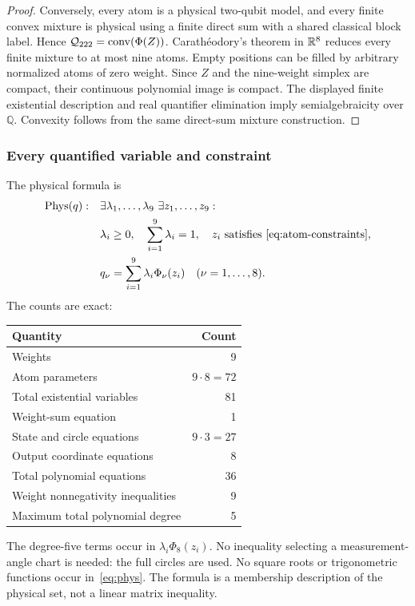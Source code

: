 \begin{proof}
Conversely, every atom is a physical two-qubit model, and every finite convex mixture is physical using a finite direct sum with a shared classical block label. Hence ${\mathcal Q_{222}}=\operatorname{conv}(\Phi(Z))$. Carath\'eodory's theorem in $\mathbb R^8$ reduces every finite mixture to at most nine atoms. Empty positions can be filled by arbitrary normalized atoms of zero weight. Since $Z$ and the nine-weight simplex are compact, their continuous polynomial image is compact. The displayed finite existential description and real quantifier elimination imply semialgebraicity over $\mathbb Q$. Convexity follows from the same direct-sum mixture construction.
\end{proof}

\subsubsection{Every quantified variable and constraint}
The physical formula is
\begin{equation}\label{eq:phys}
 \begin{aligned}
 \Phys(q):\quad&\exists\lambda_1,\ldots,\lambda_9\ 
                  \exists z_1,\ldots,z_9:\\
 &\lambda_i\ge0,\quad\sum_{i=1}^{9}\lambda_i=1,\quad
                  z_i\text{ satisfies~\eqref{eq:atom-constraints}},\\
 &q_\nu=\sum_{i=1}^{9}\lambda_i\Phi_\nu(z_i)
       \quad(\nu=1,\ldots,8).
 \end{aligned}
\end{equation}
The counts are exact:
\begin{center}
\begin{tabular}{lr}
\toprule
Quantity&Count\\\midrule
Weights&9\\
Atom parameters&$9\cdot8=72$\\
Total existential variables&81\\
Weight-sum equation&1\\
State and circle equations&$9\cdot3=27$\\
Output coordinate equations&8\\
Total polynomial equations&36\\
Weight nonnegativity inequalities&9\\
Maximum total polynomial degree&5\\\bottomrule
\end{tabular}
\end{center}
The degree-five terms occur in $\lambda_i\Phi_8(z_i)$. No inequality selecting a measurement-angle chart is needed: the full circles are used. No square roots or trigonometric functions occur in~\eqref{eq:phys}. The formula is a membership description of the physical set, not a linear matrix inequality.

